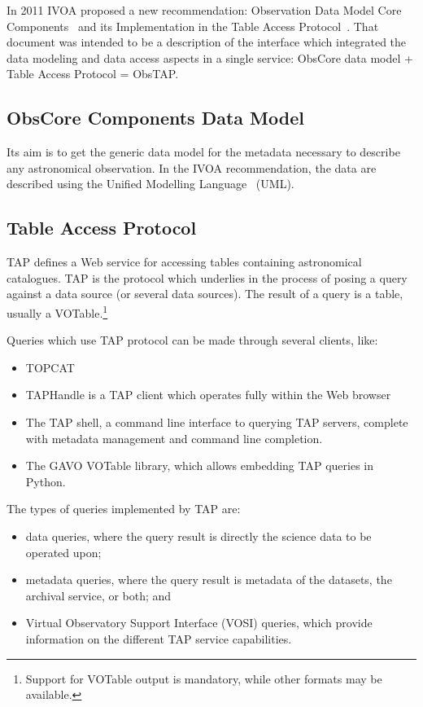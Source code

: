 In 2011 IVOA proposed a new recommendation: Observation Data Model Core
Components~\cite{2011arXiv1111.1758L}
and its Implementation in the Table Access
Protocol~\cite{2010tap..irec.....D}.
That document was intended to be a description of the interface which integrated the data modeling and data access aspects in a single service: ObsCore data model + Table Access Protocol = ObsTAP.

\subsection{ObsCore Components Data Model}

Its aim is to get the generic data model for the metadata necessary to describe any astronomical observation. In the IVOA recommendation, the data are described using
the Unified Modelling Language~\cite{Burkhardt:1997:UML} (UML).

\subsection{Table Access Protocol}

TAP defines a Web service for accessing tables containing astronomical catalogues. TAP is the protocol which underlies in the process of posing a query against a data source (or several data sources). The result of a query is a table, usually a VOTable.\footnote{Support for VOTable output is mandatory, while other formats may be available.}  

Queries which use TAP protocol can be made through several clients, like:
\begin{itemize}
\item TOPCAT
\item TAPHandle
is a TAP client
 which operates fully within the Web browser
\item The TAP shell, a command line interface to querying TAP servers, complete with metadata management and command line completion.
\item The GAVO VOTable library, which allows embedding TAP queries in Python.
\end{itemize}

The types of queries implemented by TAP are:

\begin{itemize}
\item data queries, where the query result is directly the science data to be operated upon;
\item metadata queries, where the query result is metadata of the datasets, the archival service, or both; and
\item Virtual Observatory Support Interface (VOSI) queries, which provide information on the different TAP service capabilities.
\end{itemize}


